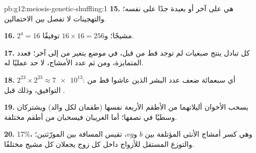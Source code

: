 \begin{solution}{pb:g12:meiosis-genetic-shuffling:1}
\textbf{15.} هي على  آخر أو بعيدة جدًا على  نفسه؛ والتهجينات
لا تفصل بين الاحتمالين.

\textbf{16.} $2^4 = 16$ مشيجًا؛ و$16 \times 16 = 256$ توفيقًا.

\textbf{17.} كل تبادل ينتج صبغيات لم توجد قط من قبل، في موضع يتغير من
 إلى آخر؛ فعدد  المتمايزة، ومن ثم عدد الأمشاج، لا
حد عمليًا له.

\textbf{18.} $2^{23} \times 2^{23} \approx \num{7e13}$: أي سبعمائة ضعف
عدد البشر الذين عاشوا قط من التوافيق، وذلك قبل .

\textbf{19.} يسحب الأخوان أليلاتهما من الأطقم الأربعة نفسها (طقمان لكل
والد) ويشتركان وسطيًا في نصفها؛ أما الغريبان فيسحبان من أطقم مختلفة.

\textbf{20.} 17\%، وهي كسر أمشاج الأنثى المؤتلفة بين $b$ و$vg$، تقيس
المسافة بين المورّثتين؛ والتوزع المستقل للأزواج  داخل كل زوج
يجعلان كل مشيج مختلفًا.
\end{solution}
